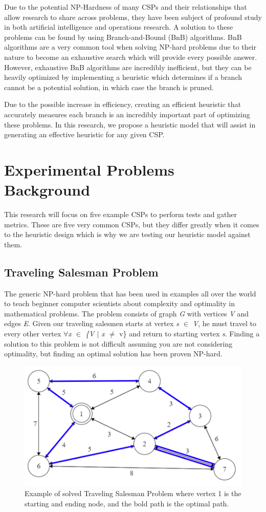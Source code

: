 \documentclass[10pt,twoside]{IEEEtran}
\begin{document}
Due to the potential NP-Hardness of many CSPs and their relationships that allow research to share across problems, they have been subject of profound study in both artificial intelligence and operations research. A solution to these problems can be found by using Branch-and-Bound (BnB) algorithms. BnB algorithms are a very common tool when solving NP-hard problems due to their nature to become an exhaustive search which will provide every possible answer. However, exhaustive BnB algorithms are incredibly inefficient, but they can be heavily optimized by implementing a heuristic which determines if a branch cannot be a potential solution, in which case the branch is pruned. 

Due to the possible increase in efficiency, creating an efficient heuristic that accurately measures each branch is an incredibly important part of optimizing these problems. In this research, we propose a heuristic model that will assist in generating an effective heuristic for any given CSP.

\section{Experimental Problems Background}
This research will focus on five example CSPs to perform tests and gather metrics. These are five very common CSPs, but they differ greatly when it comes to the heuristic design which is why we are testing our heuristic model against them.
\subsection{Traveling Salesman Problem}
The generic NP-hard problem that has been used in examples all over the world to teach beginner computer scientists about complexity and optimality in mathematical problems. The problem consists of graph \emph{G} with vertices \emph{V} and edges \emph{E}. Given our traveling salesmen starts at vertex \emph{s ${\in}$ V}, he must travel to every other vertex \emph{${\forall}$x ${\in}$ \{V ${\mid}$ x ${\neq}$} v\} and return to starting vertex \emph{s}. Finding a solution to this problem is not difficult assuming you are not considering optimality, but finding an optimal solution has been proven NP-hard.

\begin{figure}[h]
	\centering
	\includegraphics[width=0.9\linewidth]{diagrams/tsp.png}
	\caption{Example of solved Traveling Salesman Problem where vertex 1 is the starting and ending node, and the bold path is the optimal path.}
	\label{TSP fig}
\end{figure}
\end{document}
